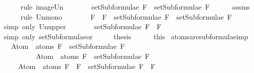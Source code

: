 \begin{isabellebody}
\ \ \ \ \isamarkupfalse%
\ {\isacharparenleft}rule\ image{\isacharunderscore}Un{\isacharparenright}\isanewline
\ \ \isamarkupfalse%
\ \isamarkupfalse%
\ {\isachardoublequoteopen}{\isasymdots}\ {\isasymsubseteq}\ setSubformulae\ F{}\ {\isasymunion}\ setSubformulae\ F{}{\isachardoublequoteclose}\isanewline
\ \ \ \ \isamarkupfalse%
\ assms\isanewline
\ \ \ \ \isamarkupfalse%
\ {\isacharparenleft}rule\ Un{\isacharunderscore}mono{\isacharparenright}\isanewline
\ \ \isamarkupfalse%
\ \isamarkupfalse%
\ {\isachardoublequoteopen}{\isasymdots}\ {\isasymsubseteq}\ {\isacharbraceleft}F{}\ \isactrlbold {\isasymor}\ F{}{\isacharbraceright}\ {\isasymunion}\ {\isacharparenleft}setSubformulae\ F{}\ {\isasymunion}\ setSubformulae\ F{}{\isacharparenright}{\isachardoublequoteclose}\isanewline
\ \ \ \ \isamarkupfalse%
\ {\isacharparenleft}simp\ only{\isacharcolon}\ Un{\isacharunderscore}upper{}{\isacharparenright}\isanewline
\ \ \isamarkupfalse%
\ \isamarkupfalse%
\ {\isachardoublequoteopen}{\isasymdots}\ {\isacharequal}\ setSubformulae\ {\isacharparenleft}F{}\ \isactrlbold {\isasymor}\ F{}{\isacharparenright}{\isachardoublequoteclose}\isanewline
\ \ \ \ \isamarkupfalse%
\ {\isacharparenleft}simp\ only{\isacharcolon}\ setSubformulae{\isacharunderscore}or{\isacharparenright}\isanewline
\ \ \isamarkupfalse%
\ \isamarkupfalse%
\ {\isacharquery}thesis\isanewline
\ \ \ \ \isamarkupfalse%
\ this\isanewline
{}\isamarkupfalse%
%
\endisatagproof
{\isafoldproof}%
%
\isadelimproof
\isanewline
%
\endisadelimproof
\isanewline
{}\isamarkupfalse%
\ atoms{\isacharunderscore}are{\isacharunderscore}subformulae{\isacharunderscore}imp{\isacharcolon}\ \isanewline
\ \ \ {\isachardoublequoteopen}Atom\ {\isacharbackquote}\ atoms\ F{}\ {\isasymsubseteq}\ setSubformulae\ F{}{\isachardoublequoteclose}\isanewline
\ \ \ \ \ \ \ \ \ \ {\isachardoublequoteopen}Atom\ {\isacharbackquote}\ atoms\ F{}\ {\isasymsubseteq}\ setSubformulae\ F{}{\isachardoublequoteclose}\isanewline
\ \ \ \ \ {\isachardoublequoteopen}Atom\ {\isacharbackquote}\ atoms\ {\isacharparenleft}F{}\ \isactrlbold {\isasymrightarrow}\ F{}{\isacharparenright}\ {\isasymsubseteq}\ setSubformulae\ {\isacharparenleft}F{}\ \isactrlbold {\isasymrightarrow}\ F{}{\isacharparenright}{\isachardoublequoteclose}\isanewline

\end{isabellebody}
